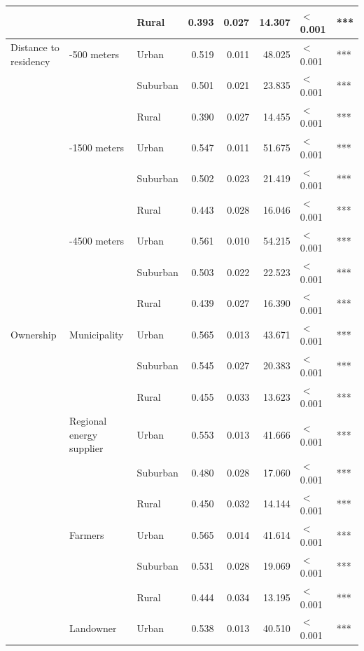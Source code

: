 \begin{longtable}[t]{>{\raggedright\arraybackslash}p{4cm}>{\raggedright\arraybackslash}p{4cm}>{\raggedright\arraybackslash}p{2.5cm}rrrll}
\cmidrule{3-8}\nopagebreak
 &  & Rural & 0.393 & 0.027 & 14.307 & $<$0.001 & ***\\
\cmidrule{1-8}\pagebreak[0]
Distance to residency & 0-500 meters & Urban & 0.519 & 0.011 & 48.025 & $<$0.001 & ***\\
\cmidrule{3-8}\nopagebreak
 &  & Suburban & 0.501 & 0.021 & 23.835 & $<$0.001 & ***\\
\cmidrule{3-8}\nopagebreak
 &  & Rural & 0.390 & 0.027 & 14.455 & $<$0.001 & ***\\
\cmidrule{2-8}\nopagebreak
 & 500-1500 meters & Urban & 0.547 & 0.011 & 51.675 & $<$0.001 & ***\\
\cmidrule{3-8}\nopagebreak
 &  & Suburban & 0.502 & 0.023 & 21.419 & $<$0.001 & ***\\
\cmidrule{3-8}\nopagebreak
 &  & Rural & 0.443 & 0.028 & 16.046 & $<$0.001 & ***\\
\cmidrule{2-8}\nopagebreak
 & 1500-4500 meters & Urban & 0.561 & 0.010 & 54.215 & $<$0.001 & ***\\
\cmidrule{3-8}\nopagebreak
 &  & Suburban & 0.503 & 0.022 & 22.523 & $<$0.001 & ***\\
\cmidrule{3-8}\nopagebreak
 &  & Rural & 0.439 & 0.027 & 16.390 & $<$0.001 & ***\\
\cmidrule{1-8}\pagebreak[0]
Ownership & Municipality & Urban & 0.565 & 0.013 & 43.671 & $<$0.001 & ***\\
\cmidrule{3-8}\nopagebreak
 &  & Suburban & 0.545 & 0.027 & 20.383 & $<$0.001 & ***\\
\cmidrule{3-8}\nopagebreak
 &  & Rural & 0.455 & 0.033 & 13.623 & $<$0.001 & ***\\
\cmidrule{2-8}\nopagebreak
 & Regional energy supplier & Urban & 0.553 & 0.013 & 41.666 & $<$0.001 & ***\\
\cmidrule{3-8}\nopagebreak
 &  & Suburban & 0.480 & 0.028 & 17.060 & $<$0.001 & ***\\
\cmidrule{3-8}\nopagebreak
 &  & Rural & 0.450 & 0.032 & 14.144 & $<$0.001 & ***\\
\cmidrule{2-8}\nopagebreak
 & Farmers & Urban & 0.565 & 0.014 & 41.614 & $<$0.001 & ***\\
\cmidrule{3-8}\nopagebreak
 &  & Suburban & 0.531 & 0.028 & 19.069 & $<$0.001 & ***\\
\cmidrule{3-8}\nopagebreak
 &  & Rural & 0.444 & 0.034 & 13.195 & $<$0.001 & ***\\
\cmidrule{2-8}\nopagebreak
 & Landowner & Urban & 0.538 & 0.013 & 40.510 & $<$0.001 & ***\\

\end{longtable}

